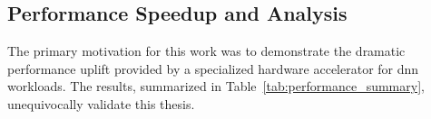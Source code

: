 \subsection{Performance Speedup and Analysis}

The primary motivation for this work was to demonstrate the dramatic performance uplift provided by a specialized hardware accelerator for \acrshort{dnn} workloads. The results, summarized in Table~\ref{tab:performance_summary}, unequivocally validate this thesis.

\begin{table}[htbp]
\centering
\caption{Summary of Gemmini performance speedup across key operational categories. Detailed results for each test case are provided in Appendix \ref{app:detailed_performance_evaluation_results}.}
\label{tab:performance_summary}
\end{table}
